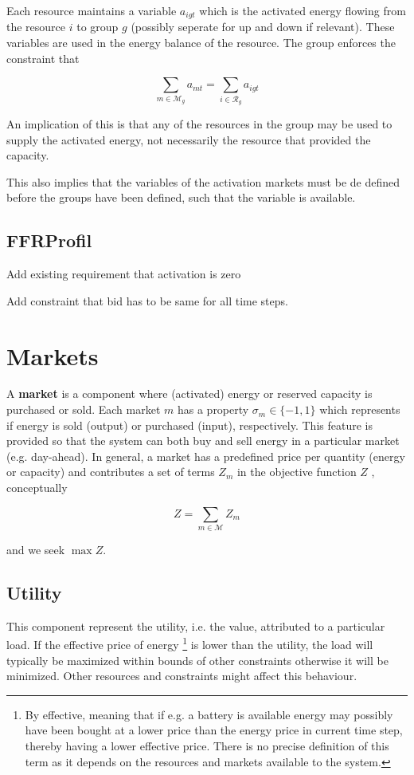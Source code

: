 \documentclass[]{report}
\renewcommand{\emph}{\textbf}
\newcommand{\resourcesg}{\mathcal{R}_g}
\newcommand{\markets}{\mathcal{M}}
\newcommand{\marketsg}{\mathcal{M}_g}
\newcommand{\sign}{\sigma}
\begin{document}
Each resource maintains a variable $a_{igt}$ which is the activated energy flowing from the resource $i$ to group $g$ (possibly seperate for up and down if relevant). These variables are used in the energy balance of the resource. The group enforces the constraint that 

\begin{equation}
    \label{eq:activation-group-resource}
    \sum_{m \in \marketsg} a_{mt} = \sum_{i \in \resourcesg} a_{igt}
\end{equation}

An implication of this is that any of the resources in the group may be used to supply the activated energy, not necessarily the resource that provided the capacity.

This also implies that the variables of the activation markets must be de defined before the groups have been defined, such that the variable is available.

\subsection{FFRProfil}

Add existing requirement that activation is zero

Add constraint that bid has to be same for all time steps.

\section{Markets}
\label{sect:markets}

A \emph{market} is a component where (activated) energy or reserved capacity is purchased or sold. Each market $m$ has a  property $\sign_m \in \{-1,1\}$ which represents if energy is sold (output) or purchased (input), respectively. This feature is provided so that the system can both buy and sell energy in a particular market (e.g. day-ahead). In general, a market has a predefined price per quantity (energy or capacity) and contributes a set of terms $Z_m$ in the objective function $Z$ , conceptually

\begin{equation}
    Z = \sum_{m \in \markets} Z_m
\end{equation}

and we seek $\max Z$.

\newpage
\subsection{Utility}
This component represent the utility, i.e. the value, attributed to a particular load. If the effective price of energy 
\footnote{By effective, meaning that if e.g. a battery is available energy may possibly have been bought at a lower price than the energy price in current time step, thereby having a lower effective price. There is no precise definition of this term as it depends on the resources and markets available to the system.}
is lower than the utility, the load will typically be maximized within bounds of other constraints otherwise it will be minimized. Other resources and constraints might affect this behaviour.
\end{document}
